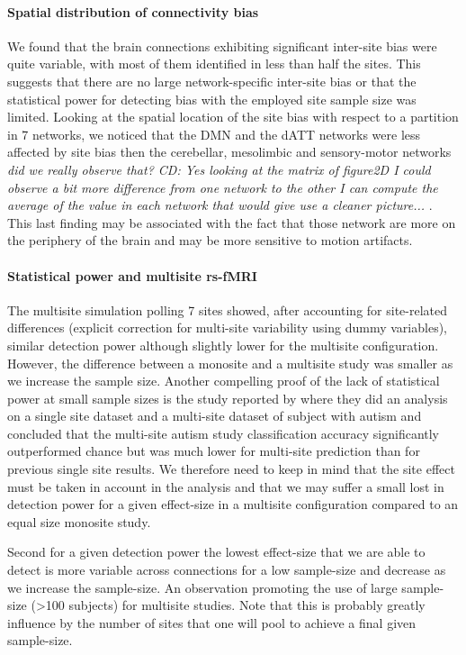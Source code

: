 \documentclass[authoryear]{elsarticle}
\begin{document}
\paragraph{Spatial distribution of connectivity bias} We found that the brain connections exhibiting significant inter-site bias were quite variable, with most of them identified in less than half the sites. This suggests that there are no large network-specific inter-site bias or that the statistical power for detecting bias with the employed site sample size was limited. Looking at the spatial location of the site bias with respect to a partition in 7 networks, we noticed that the DMN and the dATT networks were less affected by site bias then the cerebellar, mesolimbic and sensory-motor networks \emph{did we really observe that? CD: Yes looking at the matrix of figure2D I could observe a bit more difference from one network to the other I can compute the average of the value in each network that would give use a cleaner picture... }. This last finding may be associated with the fact that those network are more on the periphery of the brain and may be more sensitive to motion artifacts. 

\paragraph{Statistical power and multisite rs-fMRI} The multisite simulation polling 7 sites showed, after accounting for site-related differences (explicit correction for multi-site variability using dummy variables), similar detection power although slightly lower for the multisite configuration. However, the difference between a monosite and a multisite study was smaller as we increase the sample size. Another compelling proof of the lack of statistical power at small sample sizes is the study reported by \cite{Nielsen2013} where they did an analysis on a single site dataset and a multi-site dataset of subject with autism and concluded that the multi-site autism study classification accuracy significantly outperformed chance but was much lower for multi-site prediction than for previous single site results. We therefore need to keep in mind that the site effect must be taken in account in the analysis and that we may suffer a small lost in detection power for a given effect-size in a multisite configuration compared to an equal size monosite study.\\
\par
Second for a given detection power the lowest effect-size that we are able to detect is more variable across connections for a low sample-size and decrease as we increase the sample-size.  
An observation promoting the use of large sample-size (>100 subjects) for multisite studies. Note that this is probably greatly influence by the number of sites that one will pool to achieve a final given sample-size. 
\end{document}
